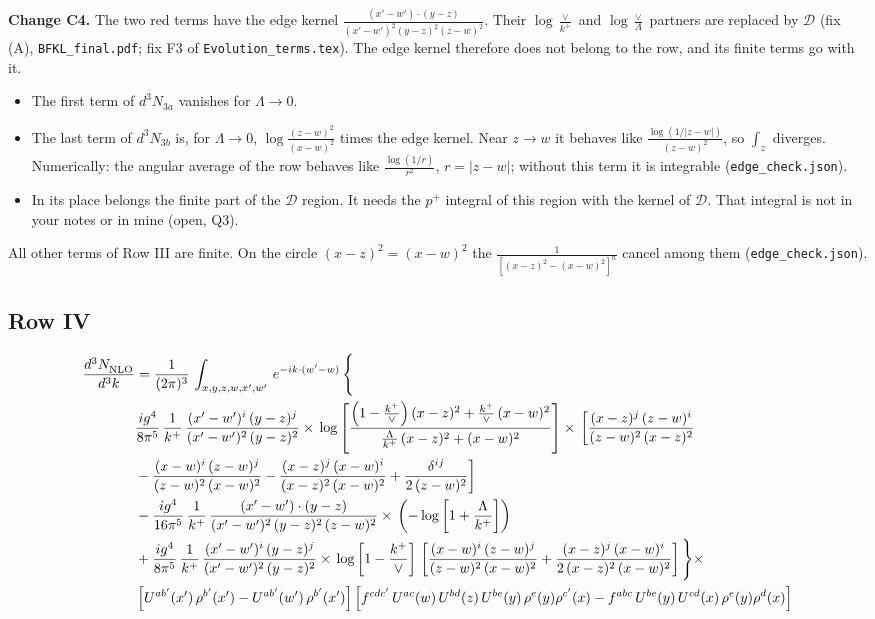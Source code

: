 \documentclass[9pt]{article}
\newcommand{\new}[1]{{\color{blue}#1}}
\numberwithin{equation}{section}
\begin{document}
\new{\textbf{Change C4.} The two red terms have the edge kernel $\frac{(x'-w')\cdot(y-z)}{(x'-w')^{2}(y-z)^{2}(z-w)^{2}}$. Their $\log\frac{\vee}{k^+}$ and $\log\frac{\vee}{\Lambda}$ partners are replaced by $\mathcal D$ (fix (A), \texttt{BFKL\_final.pdf}; fix F3 of \texttt{Evolution\_terms.tex}). The edge kernel therefore does not belong to the row, and its finite terms go with it.
\begin{itemize}
\item The first term of $d^3N_{3a}$ vanishes for $\Lambda\to0$.
\item The last term of $d^3N_{3b}$ is, for $\Lambda\to0$, $\log\frac{(z-w)^2}{(x-w)^2}$ times the edge kernel. Near $z\to w$ it behaves like $\frac{\log(1/|z-w|)}{(z-w)^2}$, so $\int_z$ diverges. Numerically: the angular average of the row behaves like $\frac{\log(1/r)}{r^2}$, $r=|z-w|$; without this term it is integrable (\texttt{edge\_check.json}).
\item In its place belongs the finite part of the $\mathcal D$ region. It needs the $p^+$ integral of this region with the kernel of $\mathcal D$. That integral is not in your notes or in mine (open, Q3).
\end{itemize}
All other terms of Row III are finite. On the circle $(x-z)^2=(x-w)^2$ the $\frac{1}{[(x-z)^2-(x-w)^2]^n}$ cancel among them (\texttt{edge\_check.json}).}
\subsection{Row IV}
\begin{align}
    \frac{d^{3}N_{\rm NLO}^{\rm}}{d^{3}k}  & =  \frac{1}{(2\pi)^{3}}\,
    \int_{x,y,z,w,x',w'}\,e^{-ik\cdot (w^\prime-w)}\,\Bigg\{\notag \\ & \frac{ig^{4}}{8\pi^{5}}\,\frac{1}{k^{+}}\,\frac{(x'-w')^{i}\,(y-z)^{j}}{(x'-w')^{2}\,(y-z)^{2}}\times\,\log{\left[\frac{\left(1-\frac{k^{+}}{\vee}\right)(x-z)^{2}+\frac{k^{+}}{\vee}\,(x-w)^{2}}{\frac{\Lambda}{k^{+}}\,(x-z)^{2}+(x-w)^{2}}\right]}\times\, \bigg[\frac{(x-z)^{j}\,(z-w)^{i}}{(z-w)^{2}\,(x-z)^{2}}\notag \\ & -\frac{(x-w)^{i}\,(z-w)^{j}}{(z-w)^{2}\,(x-w)^{2}}-\frac{(x-z)^{j}\,(x-w)^{i}}{(x-z)^{2}\,(x-w)^{2}}+\frac{\delta^{ij}}{2\,(z-w)^{2}}\bigg]\notag \\ & -\frac{ig^{4}}{16\pi^{5}}\,\frac{1}{k^{+}}\,\frac{(x'-w')\cdot (y-z)}{(x'-w')^{2}\,(y-z)^{2}\,(z-w)^{2}}\times\,\left(-\log{\left[1+\frac{\Lambda}{k^{+}}\right]}\right)\notag \\ & + \frac{ig^{4}}{8\pi^{5}}\,\frac{1}{k^{+}}\,\frac{(x'-w')^{i}\,(y-z)^{j}}{(x'-w')^{2}\,(y-z)^{2}}\times\, \log{\left[1-\frac{k^{+}}{\vee}\right]}\,\left[\frac{(x-w)^{i}\,(z-w)^{j}}{(z-w)^{2}\,(x-w)^{2}}+\frac{(x-z)^{j}\,(x-w)^{i}}{2\, (x-z)^{2}\,(x-w)^{2}}\right] \Bigg\}\times\notag \\ &  \left[U^{ab'}(x')\,\rho^{b'}(x')-U^{ab'}(w')\,\rho^{b'}(x')\right] \left[f^{cdc'}\,U^{ac}(w)\,U^{bd}(z)\,U^{be}(y)\,\rho^{e}(y)\rho^{c'}(x)-f^{abc}\,U^{be}(y)\,U^{cd}(x)\,\rho^{e}(y)\rho^{d}(x)\right]
\end{align}
\end{document}
